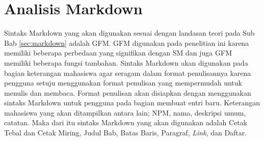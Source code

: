 \section{Analisis Markdown}
\label{sec:analisisMarkdown}
Sintaks Markdown yang akan digunakan sesuai dengan landasan teori pada Sub Bab
\ref{sec:markdown} adalah GFM. GFM digunakan pada penelitian ini karena memiliki beberapa perbedaan yang signifikan dengan SM dan juga GFM memiliki beberapa fungsi tambahan. Sintaks Markdown akan digunakan pada bagian keterangan mahasiswa agar seragam dalam format penulisannya karena pengguna setuju menggunakan format penulisan yang mempermudah untuk menulis dan membaca. Format penulisan akan disiapkan dengan menggunakan sintaks Markdown untuk pengguna pada bagian membuat entri baru. Keterangan mahasiswa yang akan ditampilkan antara lain; NPM, nama, deskripsi umum, catatan. Maka dari itu sintaks Markdown yang akan digunakan adalah Cetak Tebal dan Cetak Miring, Judul Bab, Batas Baris, Paragraf, {\it Link}, dan Daftar.

